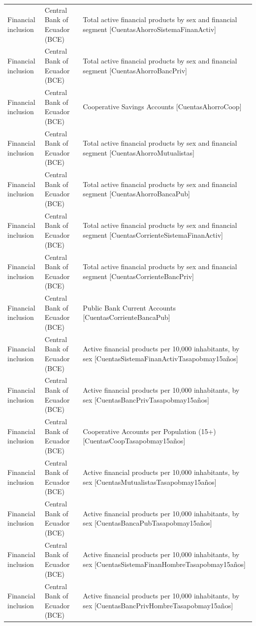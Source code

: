 \documentclass[10pt,a4paper]{article}
\begin{document}
\begin{longtable}{@{}>{\raggedright\arraybackslash}p{3.5cm}>{\raggedright\arraybackslash}p{5.6cm}>{\raggedright\arraybackslash}p{\dimexpr\textwidth-9.1cm-4\tabcolsep\relax}@{}}
Financial inclusion & Central Bank of Ecuador (BCE) & Total active financial products by sex and financial segment [CuentasAhorroSistemaFinanActiv]\\
Financial inclusion & Central Bank of Ecuador (BCE) & Total active financial products by sex and financial segment [CuentasAhorroBancPriv]\\
Financial inclusion & Central Bank of Ecuador (BCE) & Cooperative Savings Accounts [CuentasAhorroCoop]\\
Financial inclusion & Central Bank of Ecuador (BCE) & Total active financial products by sex and financial segment [CuentasAhorroMutualistas]\\
Financial inclusion & Central Bank of Ecuador (BCE) & Total active financial products by sex and financial segment [CuentasAhorroBancaPub]\\
Financial inclusion & Central Bank of Ecuador (BCE) & Total active financial products by sex and financial segment [CuentasCorrienteSistemaFinanActiv]\\
Financial inclusion & Central Bank of Ecuador (BCE) & Total active financial products by sex and financial segment [CuentasCorrienteBancPriv]\\
Financial inclusion & Central Bank of Ecuador (BCE) & Public Bank Current Accounts [CuentasCorrienteBancaPub]\\
Financial inclusion & Central Bank of Ecuador (BCE) & Active financial products per 10,000 inhabitants, by sex [CuentasSistemaFinanActivTasapobmay15a\~{n}os]\\
Financial inclusion & Central Bank of Ecuador (BCE) & Active financial products per 10,000 inhabitants, by sex [CuentasBancPrivTasapobmay15a\~{n}os]\\
Financial inclusion & Central Bank of Ecuador (BCE) & Cooperative Accounts per Population (15+) [CuentasCoopTasapobmay15a\~{n}os]\\
Financial inclusion & Central Bank of Ecuador (BCE) & Active financial products per 10,000 inhabitants, by sex [CuentasMutualistasTasapobmay15a\~{n}os]\\
Financial inclusion & Central Bank of Ecuador (BCE) & Active financial products per 10,000 inhabitants, by sex [CuentasBancaPubTasapobmay15a\~{n}os]\\
Financial inclusion & Central Bank of Ecuador (BCE) & Active financial products per 10,000 inhabitants, by sex [CuentasSistemaFinanHombreTasapobmay15a\~{n}os]\\
Financial inclusion & Central Bank of Ecuador (BCE) & Active financial products per 10,000 inhabitants, by sex [CuentasBancPrivHombreTasapobmay15a\~{n}os]\\

\end{longtable}
\end{document}
